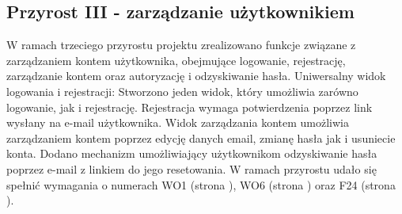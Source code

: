     \subsection{Przyrost III - zarządzanie użytkownikiem}
    \label{sec:przyrost3}
    W ramach trzeciego przyrostu projektu zrealizowano funkcje związane z zarządzaniem kontem użytkownika, obejmujące logowanie, rejestrację, zarządzanie kontem oraz autoryzację i odzyskiwanie hasła. \newline
    \indent Uniwersalny widok logowania i rejestracji: Stworzono jeden widok, który umożliwia zarówno logowanie, jak i rejestrację. Rejestracja wymaga potwierdzenia poprzez link wysłany na e-mail użytkownika. \newline
    \indent Widok zarządzania kontem umożliwia zarządzaniem kontem poprzez edycję danych email, zmianę hasła jak i usuniecie konta. \newline 
    \indent Dodano mechanizm umożliwiający użytkownikom odzyskiwanie hasła poprzez e-mail z linkiem do jego resetowania.
    W ramach przyrostu udało się spełnić wymagania o numerach WO1 (strona \pageref{tab:requirements:general1}), WO6 (strona \pageref{tab:requirements:general6}) oraz F24 (strona \pageref{tab:requirements:func24}).





